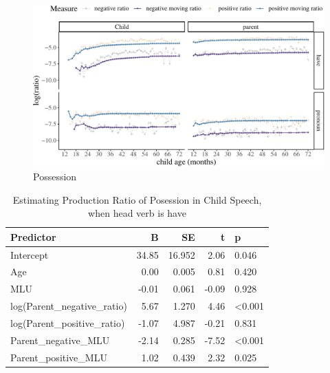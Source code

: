 \documentclass[
  english,
  man,floatsintext]{apa6}
\begin{document}
\begin{figure}[H]

{\centering \includegraphics{results_files/figure-latex/possession-1} 

}

\caption{Possession}\label{fig:possession}
\end{figure}

\clearpage

\begin{table}

\caption{\label{tab:unnamed-chunk-10}Estimating Production Ratio of Posession in Child Speech, when head verb is have}
\centering
\begin{tabular}[t]{l|r|r|r|l}
\hline
Predictor & B & SE & t & p\\
\hline
Intercept & 34.85 & 16.952 & 2.06 & 0.046\\
\hline
Age & 0.00 & 0.005 & 0.81 & 0.420\\
\hline
MLU & -0.01 & 0.061 & -0.09 & 0.928\\
\hline
log(Parent\_negative\_ratio) & 5.67 & 1.270 & 4.46 & <0.001\\
\hline
log(Parent\_positive\_ratio) & -1.07 & 4.987 & -0.21 & 0.831\\
\hline
Parent\_negative\_MLU & -2.14 & 0.285 & -7.52 & <0.001\\
\hline
Parent\_positive\_MLU & 1.02 & 0.439 & 2.32 & 0.025\\
\hline
\end{tabular}
\end{table}
\end{document}
